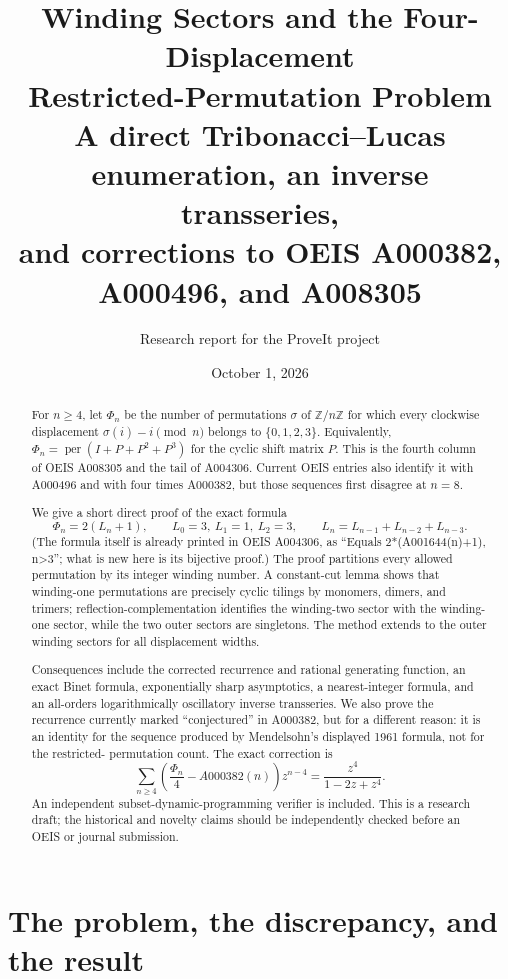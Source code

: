\documentclass[11pt,letterpaper]{article}
\title{\textbf{Winding Sectors and the Four-Displacement\\Restricted-Permutation Problem}\\[0.7em]
\large A direct Tribonacci--Lucas enumeration, an inverse transseries,\\
and corrections to OEIS A000382, A000496, and A008305}
\author{Research report for the ProveIt project}
\date{October 1, 2026}
\numberwithin{equation}{section}
\theoremstyle{definition}
\newcommand{\Z}{\mathbb Z}
\newcommand{\per}{\operatorname{per}}
\begin{document}
\maketitle

\begin{abstract}
For $n\ge4$, let $\Phi_n$ be the number of permutations $\sigma$ of
$\Z/n\Z$ for which every clockwise displacement
$\sigma(i)-i\pmod n$ belongs to $\{0,1,2,3\}$.  Equivalently,
$\Phi_n=\per(I+P+P^2+P^3)$ for the cyclic shift matrix $P$.  This is the
fourth column of OEIS A008305 and the tail of A004306.  Current OEIS entries
also identify it with A000496 and with four times A000382, but those sequences
first disagree at $n=8$.

We give a short direct proof of the exact formula
\[
  \Phi_n=2(L_n+1),
  \qquad L_0=3,\ L_1=1,\ L_2=3,
  \qquad L_n=L_{n-1}+L_{n-2}+L_{n-3}.
\]
(The formula itself is already printed in OEIS A004306, as
``Equals 2*(A001644(n)+1), n>3''; what is new here is its bijective proof.)
The proof partitions every allowed permutation by its integer winding number.
A constant-cut lemma shows that winding-one permutations are precisely cyclic
tilings by monomers, dimers, and trimers; reflection-complementation identifies
the winding-two sector with the winding-one sector, while the two outer
sectors are singletons.  The method extends to the outer winding sectors for
all displacement widths.

Consequences include the corrected recurrence and rational generating
function, an exact Binet formula, exponentially sharp asymptotics, a
nearest-integer formula, and an all-orders logarithmically oscillatory inverse
transseries.  We also prove the recurrence currently marked ``conjectured''
in A000382, but for a different reason: it is an identity for the sequence
produced by Mendelsohn's displayed 1961 formula, not for the restricted-
permutation count.  The exact correction is
\[
 \sum_{n\ge4}\left(\frac{\Phi_n}{4}-A000382(n)\right)z^{n-4}
 =\frac{z^4}{1-2z+z^4}.
\]
An independent subset-dynamic-programming verifier is included.  This is a
research draft; the historical and novelty claims should be independently
checked before an OEIS or journal submission.
\end{abstract}

\clearpage
{\small\setlength{\parskip}{0pt}\tableofcontents}
\clearpage

\section{The problem, the discrepancy, and the result}\label{wdc:sec:intro}
\end{document}

